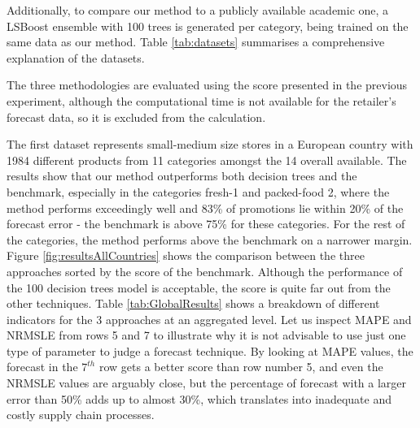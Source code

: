 \documentclass{ieeeaccess}
\begin{document}

Additionally, to compare our method to a publicly available academic one, a LSBoost ensemble with 100 trees is generated per category, being trained on the same data as our method. Table \ref{tab:datasets} summarises a comprehensive explanation of the datasets.
%
\begin{table}[t]
 \centering
{}
\caption{Summary of the real promotional datasets.}
\label{tab:datasets}
\end{table}
%
%
The three methodologies are evaluated using the score presented in the previous experiment, although the computational time is not available for the retailer's forecast data, so it is excluded from the calculation.

The first dataset represents small-medium size stores in a European country with 1984 different products from 11 categories amongst the 14 overall available. The results show that our method outperforms both decision trees and the benchmark, especially in the categories fresh-1 and packed-food 2, where the method performs exceedingly well and 83\% of promotions lie within 20\% of the forecast error - the benchmark is above 75\% for these categories. For the rest of the categories, the method performs above the benchmark on a narrower margin. Figure \ref{fig:resultsAllCountries} shows the comparison between the three approaches sorted by the score of the benchmark. Although the performance of the 100 decision trees model is acceptable, the score is quite far out from the other techniques. Table \ref{tab:GlobalResults} shows a breakdown of different indicators for the 3 approaches at an aggregated level. Let us inspect MAPE and NRMSLE from rows 5 and 7 to illustrate why it is not advisable to use just one type of parameter to judge a forecast technique.  By looking at MAPE values, the forecast in the $7^{th}$ row gets a better score than row number 5, and even the NRMSLE values are arguably close, but the percentage of forecast with a larger error than 50\% adds up to almost 30\%, which translates into inadequate and costly supply chain processes.
%
\end{document}
